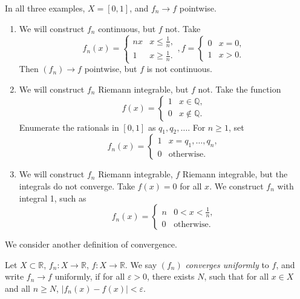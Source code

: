 \documentclass[12pt]{article}
\begin{document}
\begin{exbox}
	In all three examples, $X = [0,1]$, and $f_n \to f$ pointwise.
	\begin{enumerate}[1.]
		\item We will construct $f_n$ continuous, but $f$ not. Take
			\[
				f_n(x) =
				\begin{cases}
					nx & x \leq \frac{1}{n}, \\
					1 & x \geq \frac{1}{n}.
				\end{cases},
				f =
				\begin{cases}
					0 & x = 0, \\
					1 & x > 0.
				\end{cases}
			\]
			Then $(f_n) \to f$ pointwise, but $f$ is not continuous.
		\item We will construct $f_n$ Riemann integrable, but $f$ not. Take the function
			\[
				f(x) =
				\begin{cases}
					1 & x \in \mathbb{Q}, \\
					0 & x \not \in \mathbb{Q}.
				\end{cases}
			\]
			Enumerate the rationals in $[0,1]$ as $q_1, q_2, \ldots$. For $n \geq 1$, set
			\[
				f_n(x) =
				\begin{cases}
					1 & x = q_1, \ldots, q_n, \\
					0 & \text{otherwise}.
				\end{cases}	
			\]
		\item We will construct $f_n$ Riemann integrable, $f$ Riemann integrable, but the integrals do not converge. Take $f(x) = 0$ for all $x$. We construct $f_n$ with integral 1, such as
			\[
				f_n(x) =
				\begin{cases}
					n & 0 < x < \frac{1}{n}, \\
					0 & \text{otherwise}.
				\end{cases}
			\]
	\end{enumerate}	
\end{exbox}

We consider another definition of convergence.

\begin{definition}
	Let $X \subset \mathbb{R}$, $f_n : X \to \mathbb{R}$, $f : X \to \mathbb{R}$. We say $(f_n)$ \textit{converges uniformly} to $f$, and write $f_n \to f$ uniformly, if for all $\varepsilon > 0$, there exists $N$, such that for all $x \in X$ and all $n \geq N$, $|f_n(x) - f(x)| < \varepsilon$.
\end{definition}
\end{document}
